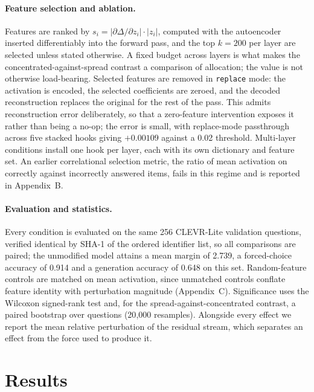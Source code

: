 \documentclass[11pt,a4paper]{article}
\begin{document}
\paragraph{Feature selection and ablation.} Features are ranked by
$s_i = |\partial \Delta / \partial z_i| \cdot |z_i|$, computed with the
autoencoder inserted differentiably into the forward pass, and the top $k = 200$
per layer are selected unless stated otherwise. A fixed budget across layers is
what makes the concentrated-against-spread contrast a comparison of allocation;
the value is not otherwise load-bearing. Selected features are removed in
\texttt{replace} mode: the activation is encoded, the selected coefficients are
zeroed, and the decoded reconstruction replaces the original for the rest of the
pass. This admits reconstruction error deliberately, so that a zero-feature
intervention exposes it rather than being a no-op; the error is small, with
replace-mode passthrough across five stacked hooks giving $+0.00109$ against a
0.02 threshold. Multi-layer conditions install one hook per layer, each with
its own dictionary and feature set. An
earlier correlational selection metric, the ratio of mean activation on
correctly against incorrectly answered items, fails in this regime and is
reported in Appendix~B.

\paragraph{Evaluation and statistics.} Every condition is evaluated on the same
256 CLEVR-Lite validation questions, verified identical by SHA-1 of the ordered
identifier list, so all comparisons are paired; the unmodified model attains a
mean margin of 2.739, a forced-choice accuracy of 0.914 and a generation
accuracy of 0.648 on this set. Random-feature
controls are matched on mean activation, since unmatched controls conflate
feature identity with perturbation magnitude (Appendix~C). Significance uses the
Wilcoxon signed-rank test and, for the spread-against-concentrated contrast, a
paired bootstrap over questions (20{,}000 resamples). Alongside every effect we
report the mean relative perturbation of the residual stream, which separates an
effect from the force used to produce it.

\section{Results}
\end{document}
